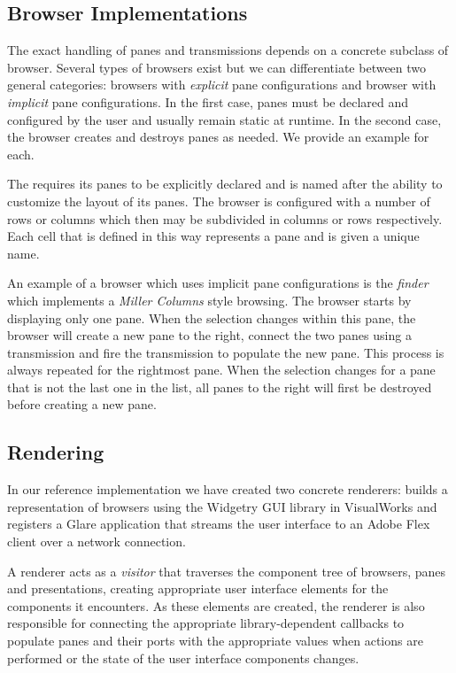 \documentclass[a4paper,10pt,twoside]{book}
\begin{document}
\subsection{Browser Implementations}
\label{sec:impl/browser-implementations}

The exact handling of panes and transmissions depends on a concrete subclass of browser. Several types of browsers exist but we can differentiate between two general categories: browsers with \emph{explicit} pane configurations and browser with \emph{implicit} pane configurations. In the first case, panes must be declared and configured by the user and usually remain static at runtime. In the second case, the browser creates and destroys panes as needed. We provide an example for each.

The  requires its panes to be explicitly declared and is named after the ability to customize the layout of its panes. The browser is configured with a number of rows or columns which then may be subdivided in columns or rows respectively. Each cell that is defined in this way represents a pane and is given a unique name.

An example of a browser which uses implicit pane configurations is the \emph{finder} which implements a \emph{Miller Columns} style browsing. The browser starts by displaying only one pane. When the selection changes within this pane, the browser will create a new pane to the right, connect the two panes using a transmission and fire the transmission to populate the new pane. This process is always repeated for the rightmost pane. When the selection changes for a pane that is not the last one in the list, all panes to the right will first be destroyed before creating a new pane.



\subsection{Rendering}
\label{sec:impl/rendering}

In our reference implementation we have created two concrete renderers:  builds a representation of browsers using the Widgetry GUI library in VisualWorks and  registers a Glare application \cite{Bunge08a} that streams the user interface to an Adobe Flex client over a network connection.

A renderer acts as a \emph{visitor} \cite{Gamm95a} that traverses the component tree of browsers, panes and presentations, creating appropriate user interface elements for the components it encounters. As these elements are created, the renderer is also responsible for connecting the appropriate library-dependent callbacks to populate panes and their ports with the appropriate values when actions are performed or the state of the user interface components changes.
\end{document}
